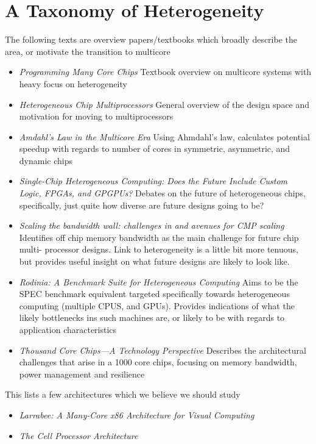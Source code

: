 \section{A Taxonomy of Heterogeneity}

The following texts are overview papers/textbooks which
broadly describe the area, or motivate the transition
to multicore
\begin{itemize}
\item \emph{Programming Many Core Chips} Textbook overview
on multicore systems with heavy focus on heterogeneity

\item \emph{Heterogeneous Chip Multiprocessors} General overview
of the design space and motivation for moving to multiprocessors
\item \emph{Amdahl's Law in the Multicore Era} Using Ahmdahl's law,
calculates potential speedup with regards to number of cores
in symmetric, asymmetric, and dynamic chips
\item \emph{Single-Chip Heterogeneous Computing: Does the Future Include Custom 
Logic, FPGAs, and GPGPUs?} Debates on the future 
of heterogeneous chips, specifically, just quite how diverse
are future designs going to be?
\item \emph{Scaling the bandwidth wall: challenges in and avenues for CMP scaling}
Identifies off chip memory bandwidth as the main challenge for future chip multi-
processor designs. Link to heterogeneity is a little bit more tenuous, but
provides useful insight on what future designs are likely to look like. 
\item \emph{Rodinia: A Benchmark Suite for Heterogeneous Computing} Aims
to be the SPEC benchmark equivalent targeted specifically towards heterogeneous
computing (multiple CPUS, and GPUs). Provides indications of what the likely
bottlenecks ins such machines are, or likely to be with regards to application
characteristics
\item \emph{Thousand Core Chips—A Technology Perspective} Describes the
architectural challenges that arise in a 1000 core chips, focusing
on memory bandwidth, power management and resilience 

\end{itemize}

This lists a few architectures which we believe we should study
\begin{itemize}
\item \emph{Larrabee: A Many-Core x86 Architecture for Visual Computing}
\item \emph{The Cell Processor Architecture}
\end{itemize}

